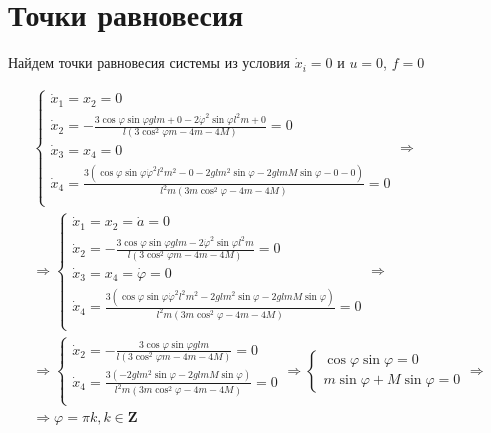 \section{Точки равновесия}
Найдем точки равновесия системы из условия $\dot{x}_i = 0$ и $u=0$, $f = 0$

\begin{multline}
    \begin{cases}
        \dot{x}_1 = x_2 = 0\\
        \dot{x}_2 = - \frac{3 \cos{\varphi} \sin {\varphi} g lm + 0-2 \dot{\varphi}^2\sin{\varphi}l^2m+0}{l(3 \cos^2 \varphi m - 4m -4M)} = 0\\
        \dot{x}_3 = x_4 = 0\\
        \dot{x}_4  = \frac{3(\cos \varphi \sin \varphi \dot{\varphi}^2l^2m^2-0-2glm^2 \sin{\varphi} - 2 glmM \sin{\varphi} - 0 - 0)}{l^2m(3m \cos^2 \varphi -4m-4M)} = 0\\
    \end{cases} \Rightarrow \\ \Rightarrow
    \begin{cases}
        \dot{x}_1 = x_2 = \dot{a} =0\\
        \dot{x}_2 = - \frac{3 \cos{\varphi} \sin {\varphi} g lm -2 \dot{\varphi}^2\sin{\varphi}l^2m}{l(3 \cos^2 \varphi m - 4m -4M)} = 0\\
        \dot{x}_3 = x_4 = \dot{\varphi} = 0\\
        \dot{x}_4  = \frac{3(\cos \varphi \sin \varphi \dot{\varphi}^2l^2m^2-2glm^2 \sin{\varphi} - 2 glmM \sin{\varphi} )}{l^2m(3m \cos^2 \varphi -4m-4M)} = 0\\
    \end{cases} \Rightarrow \\ \Rightarrow
    \begin{cases}
        \dot{x}_2 = - \frac{3 \cos{\varphi} \sin {\varphi} g lm}{l(3 \cos^2 \varphi m - 4m -4M)} = 0\\
        \dot{x}_4  = \frac{3(-2glm^2 \sin{\varphi} - 2 glmM \sin{\varphi} )}{l^2m(3m \cos^2 \varphi -4m-4M)} = 0\\
    \end{cases} \Rightarrow
    \begin{cases}
        \cos{\varphi} \sin{\varphi} = 0\\
        m\sin{\varphi}+M \sin{\varphi} = 0
    \end{cases} \Rightarrow \\
    \Rightarrow
    \varphi = \pi k, k \in \mathbf{Z}
\end{multline}


